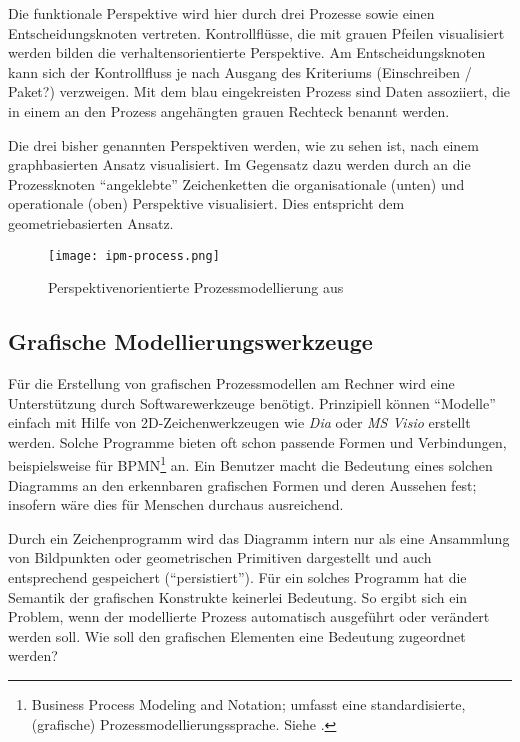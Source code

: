\documentclass[a4paper,10pt]{sphinxmanual}
\begin{document}
Die funktionale Perspektive wird hier durch drei Prozesse sowie einen Entscheidungsknoten vertreten.
Kontrollflüsse, die mit grauen Pfeilen visualisiert werden bilden die verhaltensorientierte Perspektive.
Am Entscheidungsknoten kann sich der Kontrollfluss je nach Ausgang des Kriteriums (Einschreiben / Paket?) verzweigen.
Mit dem blau eingekreisten Prozess sind Daten assoziiert, die in einem an den Prozess angehängten grauen Rechteck benannt werden.

Die drei bisher genannten Perspektiven werden, wie zu sehen ist, nach einem graphbasierten Ansatz visualisiert.
Im Gegensatz dazu werden durch an die Prozessknoten "`angeklebte"' Zeichenketten die organisationale (unten) und operationale (oben) Perspektive visualisiert.
Dies entspricht dem geometriebasierten Ansatz.
\begin{figure}[htbp]
\centering
\capstart

\texttt{[image: ipm-process.png]}
\caption{Perspektivenorientierte Prozessmodellierung aus \cite{roth_konzeption_2011}}\label{grundlagen:ipm-process}\end{figure}


\subsection{Grafische Modellierungswerkzeuge}
\label{grundlagen:modellierungswerkzeuge}\label{grundlagen:grafische-modellierungswerkzeuge}
Für die Erstellung von grafischen Prozessmodellen am Rechner wird eine Unterstützung durch Softwarewerkzeuge benötigt.
Prinzipiell können "`Modelle"' einfach mit Hilfe von 2D-Zeichenwerkzeugen wie \emph{Dia} \cite{www:dia} oder \emph{MS Visio} \cite{www:visio} erstellt werden.
Solche Programme bieten oft schon passende Formen und Verbindungen, beispielsweise für BPMN\footnote{
Business Process Modeling and Notation; umfasst eine standardisierte, (grafische) Prozessmodellierungssprache. Siehe \cite{www:bpmn}.
} an.
Ein Benutzer macht die Bedeutung eines solchen Diagramms an den erkennbaren grafischen Formen und deren Aussehen fest; insofern wäre dies für Menschen durchaus ausreichend.

Durch ein Zeichenprogramm wird das Diagramm intern nur als eine Ansammlung von Bildpunkten oder geometrischen Primitiven dargestellt und auch entsprechend gespeichert ("`persistiert"').
Für ein solches Programm hat die Semantik der grafischen Konstrukte keinerlei Bedeutung.
So ergibt sich ein Problem, wenn der modellierte Prozess automatisch ausgeführt oder verändert werden soll.
Wie soll den grafischen Elementen eine Bedeutung zugeordnet werden?
\end{document}
